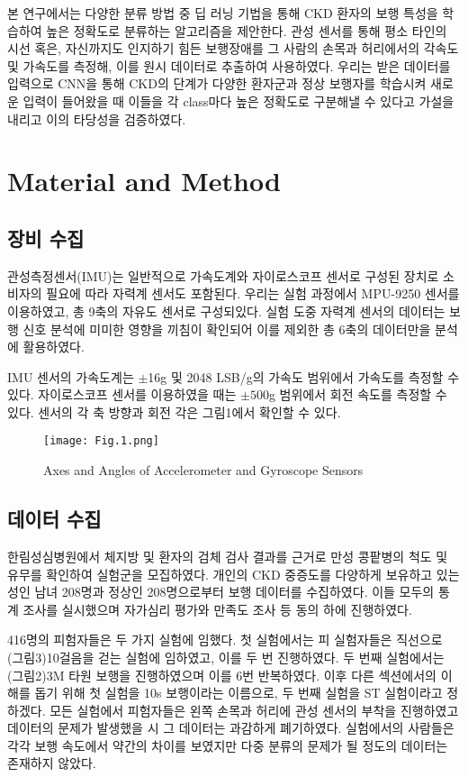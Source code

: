 \documentclass{article}
\begin{document}
본 연구에서는 다양한 분류 방법 중 딥 러닝 기법을 통해 CKD 환자의 보행
특성을 학습하여 높은 정확도로 분류하는 알고리즘을 제안한다. 관성 센서를
통해 평소 타인의 시선 혹은, 자신까지도 인지하기 힘든 보행장애를 그
사람의 손목과 허리에서의 각속도 및 가속도를 측정해, 이를 원시 데이터로
추출하여 사용하였다. 우리는 받은 데이터를 입력으로 CNN을 통해 CKD의
단계가 다양한 환자군과 정상 보행자를 학습시켜 새로운 입력이 들어왔을 때
이들을 각 class마다 높은 정확도로 구분해낼 수 있다고 가설을 내리고 이의
타당성을 검증하였다.

\section{Material and Method}

\subsection{장비 수집}

관성측정센서(IMU)는 일반적으로 가속도계와 자이로스코프 센서로 구성된
장치로 소비자의 필요에 따라 자력계 센서도 포함된다. 우리는 실험 과정에서
MPU-9250 센서를 이용하였고, 총 9축의 자유도 센서로 구성되있다. 실험 도중
자력계 센서의 데이터는 보행 신호 분석에 미미한 영향을 끼침이 확인되어
이를 제외한 총 6축의 데이터만을 분석에 활용하였다.

IMU 센서의 가속도계는 \(\pm\)16g 및 2048 LSB/g의 가속도 범위에서
가속도를 측정할 수 있다. 자이로스코프 센서를 이용하였을 때는
\(\pm 500\)g 범위에서 회전 속도를 측정할 수 있다. 센서의 각 축 방향과
회전 각은 그림1에서 확인할 수 있다.

\begin{figure}
\centering
\texttt{[image: Fig.1.png]}
\caption{\label{Figure.1:}Axes and Angles of Accelerometer and Gyroscope Sensors}
\end{figure}

\subsection{데이터 수집}

한림성심병원에서 체지방 및 환자의 검체 검사 결과를 근거로 만성 콩팥병의
척도 및 유무를 확인하여 실험군을 모집하였다. 개인의 CKD 중증도를
다양하게 보유하고 있는 성인 남녀 208명과 정상인 208명으로부터 보행
데이터를 수집하였다. 이들 모두의 통계 조사를 실시했으며 자가심리 평가와
만족도 조사 등 동의 하에 진행하였다.

416명의 피험자들은 두 가지 실험에 임했다. 첫 실험에서는 피 실험자들은
직선으로 (그림3)10걸음을 걷는 실험에 임하였고, 이를 두 번 진행하였다. 두
번째 실험에서는 (그림2)3M 타원 보행을 진행하였으며 이를 6번 반복하였다.
이후 다른 섹션에서의 이해를 돕기 위해 첫 실험을 10s 보행이라는 이름으로,
두 번째 실험을 ST 실험이라고 정하겠다. 모든 실험에서 피험자들은 왼쪽
손목과 허리에 관성 센서의 부착을 진행하였고 데이터의 문제가 발생했을 시
그 데이터는 과감하게 폐기하였다. 실험에서의 사람들은 각각 보행 속도에서
약간의 차이를 보였지만 다중 분류의 문제가 될 정도의 데이터는 존재하지 않았다.
\end{document}
